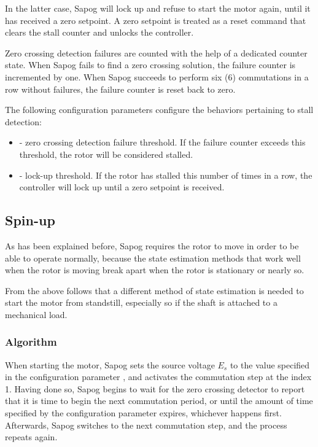 \documentclass{zubaxdoc}
\begin{document}
	In the latter case, Sapog will lock up and refuse to start the motor again,
	until it has received a zero setpoint.
	A zero setpoint is treated as a reset command that clears the stall counter and unlocks the controller.
	
	Zero crossing detection failures are counted with the help of a dedicated counter state.
	When Sapog fails to find a zero crossing solution,
	the failure counter is incremented by one.
	When Sapog succeeds to perform six (6) commutations in a row without failures,
	the failure counter is reset back to zero.
	
	The following configuration parameters configure the behaviors pertaining to stall detection:
	
	\begin{itemize}
		\item {} - zero crossing detection failure threshold.
		If the failure counter exceeds this threshold, the rotor will be considered stalled.
		\item {} - lock-up threshold.
		If the rotor has stalled this number of times in a row,
		the controller will lock up until a zero setpoint is received.
	\end{itemize}
	
	\subsection{Spin-up}
	
	As has been explained before, Sapog requires the rotor to move in order to be able to operate normally,
	because the state estimation methods that work well when the rotor is moving break apart when the rotor is
	stationary or nearly so.
	
	From the above follows that a different method of state estimation is needed to start the motor
	from standstill, especially so if the shaft is attached to a mechanical load.
	
	\subsubsection{Algorithm}
	
	When starting the motor, Sapog sets the source voltage $E_s$ to the value specified in the
	configuration parameter , and activates the commutation step at the index 1.
	Having done so, Sapog begins to wait for the zero crossing detector to report that it is time to
	begin the next commutation period, or until the amount of time specified by the configuration parameter
	 expires, whichever happens first.
	Afterwards, Sapog switches to the next commutation step, and the process repeats again.
	
\end{document}

